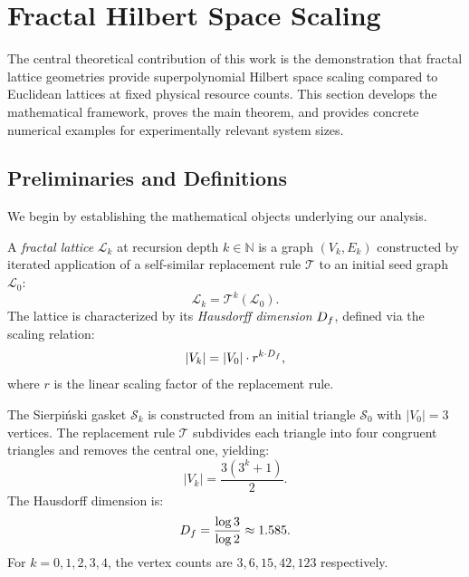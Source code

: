 
\section{Fractal Hilbert Space Scaling}
\label{sec:hilbert_scaling}

The central theoretical contribution of this work is the demonstration that
fractal lattice geometries provide superpolynomial Hilbert space scaling
compared to Euclidean lattices at fixed physical resource counts. This section
develops the mathematical framework, proves the main theorem, and provides
concrete numerical examples for experimentally relevant system sizes.

\subsection{Preliminaries and Definitions}

We begin by establishing the mathematical objects underlying our analysis.

\begin{definition}
\label{def:fractal_lattice}
A \emph{fractal lattice} $\mathcal{L}_k$ at recursion depth $k \in \mathbb{N}$
is a graph $(V_k, E_k)$ constructed by iterated application of a self-similar
replacement rule $\mathcal{T}$ to an initial seed graph $\mathcal{L}_0$:
\begin{equation}
\mathcal{L}_k = \mathcal{T}^k(\mathcal{L}_0).
\end{equation}
The lattice is characterized by its \emph{Hausdorff dimension} $D_f$, defined
via the scaling relation:
\begin{equation}
|V_k| = |V_0| \cdot r^{k \cdot D_f},
\label{eq:hausdorff_def}
\end{equation}
where $r$ is the linear scaling factor of the replacement rule.
\end{definition}

\begin{example}
\label{ex:sierpinski}
The Sierpi\'{n}ski gasket $\mathcal{S}_k$ is constructed from an initial
triangle $\mathcal{S}_0$ with $|V_0| = 3$ vertices. The replacement rule
$\mathcal{T}$ subdivides each triangle into four congruent triangles and
removes the central one, yielding:
\begin{equation}
|V_k| = \frac{3(3^k + 1)}{2}.
\end{equation}
The Hausdorff dimension is:
\begin{equation}
D_f = \frac{\log 3}{\log 2} \approx 1.585.
\label{eq:sierpinski_dim}
\end{equation}
For $k = 0, 1, 2, 3, 4$, the vertex counts are $3, 6, 15, 42, 123$ respectively.
\end{example}

